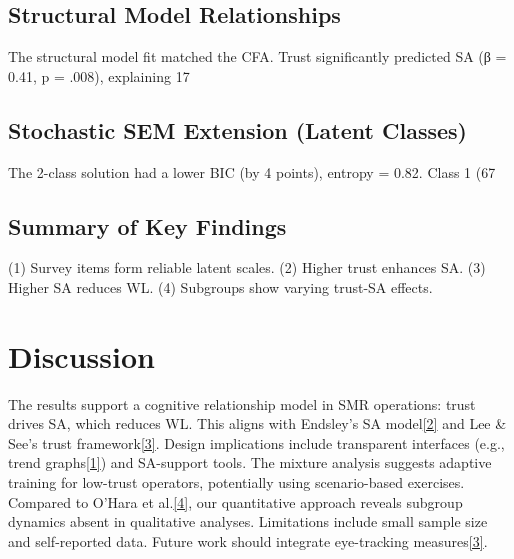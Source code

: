 \documentclass[conference]{IEEEtran}
\begin{document}
\subsection{Structural Model Relationships}
The structural model fit matched the CFA. Trust significantly predicted SA (β = 0.41, p = .008), explaining 17%

\subsection{Stochastic SEM Extension (Latent Classes)}
The 2-class solution had a lower BIC (by 4 points), entropy = 0.82. Class 1 (67%

\subsection{Summary of Key Findings}
(1) Survey items form reliable latent scales. (2) Higher trust enhances SA. (3) Higher SA reduces WL. (4) Subgroups show varying trust-SA effects.

\section{Discussion}
The results support a cognitive relationship model in SMR operations: trust drives SA, which reduces WL. This aligns with Endsley’s SA model\href{https://www.tandfonline.com/doi/abs/10.1177/001872089503700103}{[2]} and Lee & See’s trust framework\href{https://www.tandfonline.com/doi/abs/10.1518/hfes.46.1.50_30392}{[3]}. Design implications include transparent interfaces (e.g., trend graphs\href{https://www.researchgate.net/publication/337420277_Designing_for_Situation_Awareness_in_the_Main_Control_Room_of_a_Small_Modular_Reactor}{[1]}) and SA-support tools. The mixture analysis suggests adaptive training for low-trust operators, potentially using scenario-based exercises. Compared to O’Hara et al.\href{https://www.nrc.gov/docs/ML1213/ML12131A074.pdf}{[4]}, our quantitative approach reveals subgroup dynamics absent in qualitative analyses. Limitations include small sample size and self-reported data. Future work should integrate eye-tracking measures\href{https://www.tandfonline.com/doi/abs/10.1177/1541931219631072}{[3]}.
\end{document}

